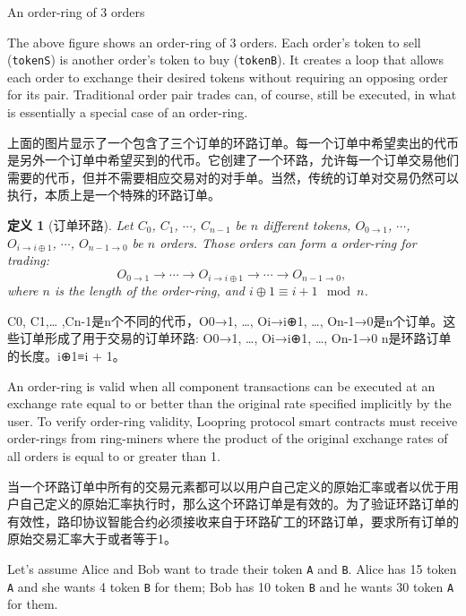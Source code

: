 \documentclass[UTF8,nofonts]{ctexart}
\makeatletter
\newtheorem{definition}{定义}[section]
\newenvironment{figurehere}
 {\def\@captype{figure}}
 {}
\makeatother
\begin{document}
\begin{multicols}{2}
\begin{center}
\begin{figurehere}
\begin{tikzpicture}
\end{tikzpicture}

\caption{An order-ring of 3 orders}
\label{fig:ring}
\end{figurehere}
\end{center}


The above figure shows an order-ring of 3 orders. Each order's token to sell (\verb|tokenS|) is another order's token to buy (\verb|tokenB|). It creates a loop that allows each order to exchange their desired tokens without requiring an opposing order for its pair. Traditional order pair trades can, of course, still be executed, in what is essentially a special case of an order-ring. 

上面的图片显示了一个包含了三个订单的环路订单。每一个订单中希望卖出的代币是另外一个订单中希望买到的代币。它创建了一个环路，允许每一个订单交易他们需要的代币，但并不需要相应交易对的对手单。当然，传统的订单对交易仍然可以执行，本质上是一个特殊的环路订单。


\begin{definition}[订单环路] Let $C_{0}$, $C_{1}$, $\cdots$, $C_{n-1}$ be $n$ different tokens, $O_{0\rightarrow 1}$, $\cdots$, $O_{i\rightarrow i\oplus 1}$, $\cdots$, $O_{n-1 \rightarrow 0}$ be $n$ orders. Those orders can form a order-ring for trading:
$$O_{0\rightarrow 1} \rightarrow \cdots \rightarrow O_{i\rightarrow i\oplus 1} \rightarrow \cdots \rightarrow O_{n-1\rightarrow 0} \text{, }$$
where $n$ is the length of the order-ring, and $i\oplus 1 \equiv i+1 \mod n$.
\end{definition}

 C0, C1,… ,Cn-1是n个不同的代币，O0→1, …, Oi→i⊕1, …, On-1→0是n个订单。这些订单形成了用于交易的订单环路: 
O0→1, …, Oi→i⊕1, …, On-1→0
n是环路订单的长度。i⊕1≡i + 1。


An order-ring is valid when all component transactions can be executed at an exchange rate equal to or better than the original rate specified implicitly by the user. To verify order-ring validity, Loopring protocol smart contracts must receive order-rings from ring-miners where the product of the original exchange rates of all orders is equal to or greater than 1.

当一个环路订单中所有的交易元素都可以以用户自己定义的原始汇率或者以优于用户自己定义的原始汇率执行时，那么这个环路订单是有效的。为了验证环路订单的有效性，路印协议智能合约必须接收来自于环路矿工的环路订单，要求所有订单的原始交易汇率大于或者等于1。


Let's assume Alice and Bob want to trade their token \verb|A| and \verb|B|. Alice has 15 token \verb|A| and she wants 4 token \verb|B| for them; Bob has 10 token \verb|B|  and he wants 30 token \verb|A| for them.


\end{multicols}
\end{document}
